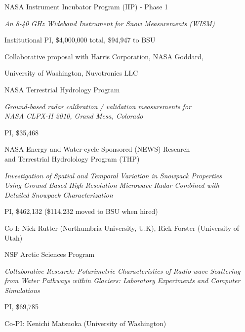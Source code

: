\documentclass[11pt]{article}
\renewenvironment{itemize}{
  \begin{list}{}{
    \setlength{\leftmargin}{1.5em}
    \setlength{\itemsep}{0pt}
    \setlength{\parskip}{0pt}
  }
}{
  \end{list}
}
\begin{document}
\begin{itemize}
\pagebreak

\item[11/2011-12/2014] NASA Instrument Incubator Program (IIP) - Phase 1
\begin{itemize}
\item \textit{An 8-40 GHz Wideband Instrument for Snow Measurements (WISM)}
\item Institutional PI, \$4,000,000 total,  \$94,947 to BSU
\item Collaborative proposal with Harris Corporation, NASA Goddard, 
\item University of Washington, Nuvotronics LLC
\end{itemize}

\item[08/2010-08/2012] NASA Terrestrial Hydrology Program
\begin{itemize}
\item \textit{Ground-based radar calibration / validation measurements for \\ NASA CLPX-II 2010, Grand Mesa, Colorado}
\item PI, \$35,468
\end{itemize}

\item[08/2006-07/2009] NASA Energy and Water-cycle Sponsored (NEWS) Research \\
and Terrestrial Hydrolology Program (THP)
\begin{itemize}
  \item \textit{Investigation of Spatial and Temporal Variation in Snowpack Properties \\
  Using Ground-Based High Resolution Microwave Radar Combined with \\
  Detailed Snowpack Characterization}
  \item PI, \$462,132 (\$114,232 moved to BSU when hired)
  \item Co-I: Nick Rutter (Northumbria University, U.K), Rick Forster (University of Utah)
\end{itemize}

\item[09/2005-08/2010] NSF Arctic Sciences Program
\begin{itemize}
  \item \textit{Collaborative Research: Polarimetric Characteristics of Radio-wave 
  Scattering from Water Pathways within Glaciers: Laboratory Experiments and Computer 
  Simulations}
  \item PI, \$69,785
  \item Co-PI: Kenichi Matsuoka (University of Washington)
\end{itemize}
\end{itemize}
\end{document}
